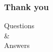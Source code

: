 \documentclass[10pt]{beamer}
\begin{document}
\begin{frame}

\frametitle{Thank you}

\begin{center}
\Large{Questions\\
\&\\
Answers}\\
\end{center}

\end{frame}
\end{document}
